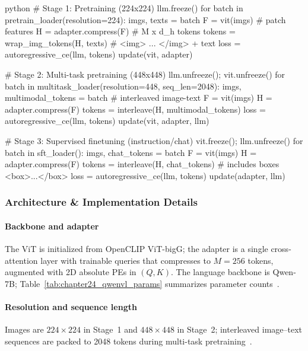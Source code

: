 \begin{enrichment}
\begin{enrichment}
\begin{mintedbox}{python}
            # Stage 1: Pretraining (224x224)
            llm.freeze()
            for batch in pretrain_loader(resolution=224):
                imgs, texts = batch
                F = vit(imgs)                      # patch features
                H = adapter.compress(F)            # M x d_h tokens
                tokens = wrap_img_tokens(H, texts) # <img> ... </img> + text
                loss = autoregressive_ce(llm, tokens)
                update(vit, adapter)
            
            # Stage 2: Multi-task pretraining (448x448)
            llm.unfreeze(); vit.unfreeze()
            for batch in multitask_loader(resolution=448, seq_len=2048):
                imgs, multimodal_tokens = batch    # interleaved image-text
                F = vit(imgs)
                H = adapter.compress(F)
                tokens = interleave(H, multimodal_tokens)
                loss = autoregressive_ce(llm, tokens)
                update(vit, adapter, llm)
            
            # Stage 3: Supervised finetuning (instruction/chat)
            vit.freeze(); llm.unfreeze()
            for batch in sft_loader():
                imgs, chat_tokens = batch
                F = vit(imgs)
                H = adapter.compress(F)
                tokens = interleave(H, chat_tokens)  # includes boxes <box>...</box>
                loss = autoregressive_ce(llm, tokens)
                update(adapter, llm)
        \end{mintedbox}
        
        \newpage
        
        \subsubsection{Architecture \& Implementation Details}
        \label{subsubsec:chapter24_qwenvl_arch}
        
        \paragraph{Backbone and adapter}
        The ViT is initialized from OpenCLIP ViT\mbox{-}bigG; the adapter is a single cross\mbox{-}attention layer with trainable queries that compresses to \(M{=}256\) tokens, augmented with 2D absolute PEs in \((Q,K)\). The language backbone is Qwen\mbox{-}7B; Table~\ref{tab:chapter24_qwenvl_params} summarizes parameter counts~\cite{bai2023_qwenvl}.
        
        \paragraph{Resolution and sequence length}
        Images are \(224{\times}224\) in Stage~1 and \(448{\times}448\) in Stage~2; interleaved image–text sequences are packed to 2048 tokens during multi\mbox{-}task pretraining~\cite{bai2023_qwenvl}.
        

\end{enrichment}
\end{enrichment}
